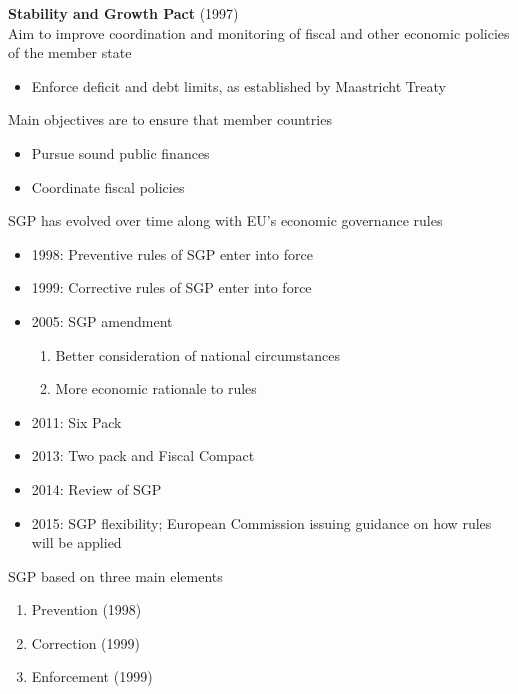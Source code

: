 \documentclass{beamer}
\begin{document}
\begin{frame}
  \textbf{Stability and Growth Pact} (1997)\\
  Aim to improve coordination and monitoring of fiscal and other economic policies of the member state
  \begin{itemize}
    \item Enforce deficit and debt limits, as established by Maastricht Treaty
  \end{itemize}
  \medskip
  Main objectives are to ensure that member countries
  \begin{itemize}
    \item Pursue sound public finances
    \item Coordinate fiscal policies
  \end{itemize}
\end{frame}

\begin{frame}
  SGP has evolved over time along with EU's economic governance rules
\begin{itemize}
  \item 1998: Preventive rules of SGP enter into force
  \item 1999: Corrective rules of SGP enter into force
  \item 2005: SGP amendment
  \begin{enumerate}
    \item Better consideration of national circumstances
    \item More economic rationale to rules
  \end{enumerate}
  \medskip  
  \item 2011: Six Pack 
  \item 2013: Two pack and Fiscal Compact
  \item 2014: Review of SGP
  \item 2015: SGP flexibility; European Commission issuing guidance on how rules will be applied
\end{itemize}
\end{frame}

\begin{frame}
  SGP based on three main elements
\begin{enumerate}
  \item Prevention (1998)
  \item Correction (1999)
  \item Enforcement (1999)
\end{enumerate}
\end{frame}
\end{document}
